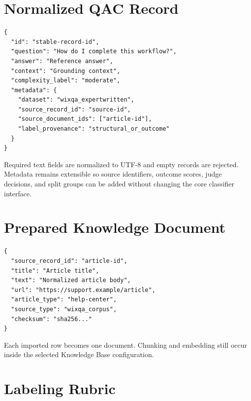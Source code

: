 
\section{Normalized QAC Record}

\begin{lstlisting}[language={},caption={Illustrative normalized QAC record.}]
{
  "id": "stable-record-id",
  "question": "How do I complete this workflow?",
  "answer": "Reference answer",
  "context": "Grounding context",
  "complexity_label": "moderate",
  "metadata": {
    "dataset": "wixqa_expertwritten",
    "source_record_id": "source-id",
    "source_document_ids": ["article-id"],
    "label_provenance": "structural_or_outcome"
  }
}
\end{lstlisting}

Required text fields are normalized to UTF-8 and empty records are rejected.
Metadata remains extensible so source identifiers, outcome scores, judge
decisions, and split groups can be added without changing the core classifier
interface.

\section{Prepared Knowledge Document}

\begin{lstlisting}[language={},caption={Illustrative prepared WixQA document.}]
{
  "source_record_id": "article-id",
  "title": "Article title",
  "text": "Normalized article body",
  "url": "https://support.example/article",
  "article_type": "help-center",
  "source_type": "wixqa_corpus",
  "checksum": "sha256..."
}
\end{lstlisting}

Each imported row becomes one document. Chunking and embedding still occur
inside the selected Knowledge Base configuration.

\section{Labeling Rubric}

